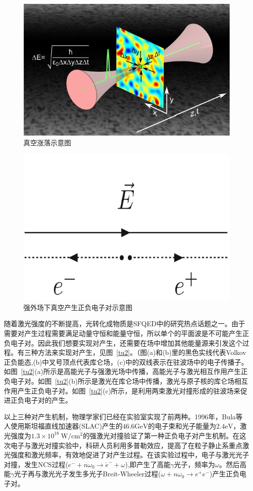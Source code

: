 \begin{figure}
  \centering
  \includegraphics[width=0.8\linewidth]{figures/fig/fig1.3.jpg}
  \caption{真空涨落示意图}
  \label{tu3}
\end{figure}
\begin{figure}
  \centering
  \includegraphics[width=0.8\linewidth]{figures/fig/fig1.4.jpg}
  \caption{强外场下真空产生正负电子对示意图}
  \label{tu4}
\end{figure}

随着激光强度的不断提高，光转化成物质是SFQED中的研究热点话题之一。由于需要对产生过程需要满足动量守恒和能量守恒，所以单个的平面波是不可能产生正负电子对。因此我们想要实现对产生，还需要在场中增加其他能量源来引发这个过程。有三种方法来实现对产生，见图~\ref{tu2}。（图(a)和(b)里的黑色实线代表Volkov正负能态,(b)中叉号顶点代表库仑场，(c)中的双线表示在驻波场中的电子传播子。如图~\ref{tu2}(a)所示是高能光子与强激光场中传播，高能光子与激光相互作用产生正负电子对。如图~\ref{tu2}(b)所示是激光在库仑场中传播，激光与原子核的库仑场相互作用产生正负电子对。如图~\ref{tu2}(c)所示，是利用两束激光对撞形成的驻波场来促进正负电子对的产生。

以上三种对产生机制，物理学家们已经在实验室实现了前两种。1996年，Bula等人使用斯坦福直线加速器(SLAC)产生的$46.6\mathrm{GeV}$的电子束和光子能量为$2.4\mathrm{eV}$，激光强度为$1.3 \times10^{18}~\mathrm{W/cm^{2}}$的强激光对撞验证了第一种正负电子对产生机制\cite{1996BW}。在这次电子与激光对撞实验中，科研人员利用多普勒效应，提高了在粒子静止系重点激光强度和激光频率，有效地促进了对产生过程。在该实验过程中，电子与激光光子对撞，发生NCS过程($e^- + n \omega_0 \to \acute e^- + \omega$),即产生了高能$\gamma$光子，频率为$\omega$。然后高能$\gamma$光子再与激光光子发生多光子Breit-Wheeler过程($\omega + n \omega_0 \to e^+ e^-$)产生正负电子对。

